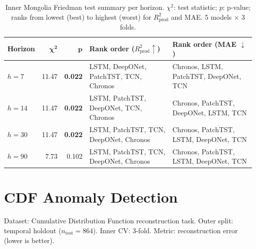 \documentclass[11pt]{article}
\newcommand{\best}[1]{\textbf{#1}}
\newcommand{\rp}{R^2_\text{prod}}
\begin{document}
\begin{table}[ht]
\centering
\caption{Inner Mongolia Friedman test summary per horizon.
$\chi^2$: test statistic; $p$: p-value; ranks from lowest (best) to highest (worst) for $\rp$ and MAE.
5 models $\times$ 3 folds.}
\label{tab:im_friedman}
\small
\setlength{\tabcolsep}{3pt}
\begin{tabular}{@{}l rr l l@{}}
\toprule
\textbf{Horizon} & $\boldsymbol{\chi^2}$ & $\boldsymbol{p}$ & \textbf{Rank order ($\rp \uparrow$)} & \textbf{Rank order (MAE $\downarrow$)} \\
\midrule
$h{=}7$    & 11.47 & \best{0.022} & LSTM, DeepONet, PatchTST, TCN, Chronos & Chronos, LSTM, PatchTST, DeepONet, TCN \\
$h{=}14$   & 11.47 & \best{0.022} & LSTM, PatchTST, DeepONet, TCN, Chronos & Chronos, PatchTST, DeepONet, LSTM, TCN \\
$h{=}30$   & 11.47 & \best{0.022} & LSTM, PatchTST, TCN, DeepONet, Chronos & Chronos, PatchTST, LSTM, DeepONet, TCN \\
$h{=}90$   & 7.73  & 0.102 & LSTM, PatchTST, TCN, DeepONet, Chronos & Chronos, PatchTST, LSTM, DeepONet, TCN \\
\bottomrule
\end{tabular}
\end{table}

\newpage
\section{CDF Anomaly Detection}

Dataset: Cumulative Distribution Function reconstruction task.
Outer split: temporal holdout ($n_\text{test} = 864$).
Inner CV: 3-fold.
Metric: reconstruction error (lower is better).
\end{document}
